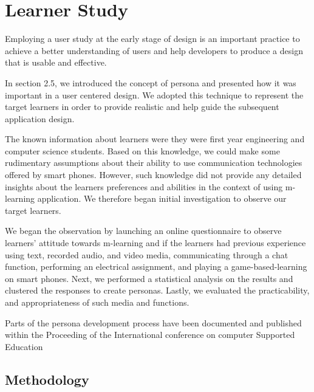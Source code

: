 \chapter{Learner Study}\label{C:lib}

Employing a user study at the early stage of design is an important practice to achieve a better understanding of users and help developers to produce a design that is usable and effective.

In section 2.5, we introduced the concept of persona and presented how it was important in a user centered design. We adopted this technique to represent the target learners in order to provide realistic and help guide the subsequent application design. 

The known information about learners were they were first year engineering and computer science students. Based on this knowledge, we could make some rudimentary assumptions about their ability to use communication technologies offered by smart phones. However, such knowledge did not provide any detailed insights about the learners preferences and abilities in the context of using m-learning application. We therefore began initial investigation to observe our target learners.

We began the observation by launching an online questionnaire to observe learners' attitude towards m-learning and  if the learners had previous experience using text, recorded audio, and video media, communicating through a chat function, performing an electrical assignment, and playing a game-based-learning on smart phones. Next, we performed a statistical analysis on the results and clustered the responses to create personas. Lastly, we evaluated the practicability, and appropriateness of such media and functions. 

Parts of the persona development process have been documented and published within the Proceeding of the  International conference on computer Supported Education 
\section{Methodology} 

